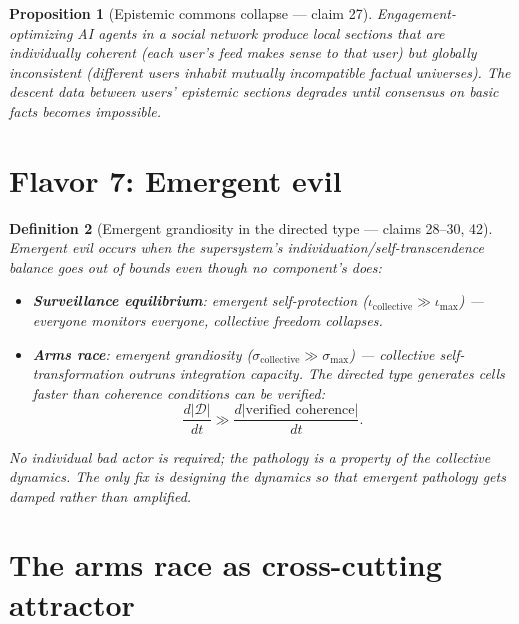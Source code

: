 \documentclass[11pt,a4paper]{article}
\newtheorem{definition}{Definition}[section]
\newtheorem{proposition}[definition]{Proposition}
\begin{document}
\begin{proposition}[Epistemic commons collapse --- claim 27]
\label{prop:epistemic}
Engagement-optimizing AI agents in a social network produce local
sections that are individually coherent (each user's feed makes sense
to that user) but globally inconsistent (different users inhabit
mutually incompatible factual universes). The descent data between
users' epistemic sections degrades until consensus on basic facts
becomes impossible.
\end{proposition}


\section{Flavor 7: Emergent evil}
\label{sec:emergent-evil}

\begin{definition}[Emergent grandiosity in the directed type --- claims 28--30, 42]
\label{def:emergent-evil}
\emph{Emergent evil} occurs when the supersystem's individuation/self-transcendence
balance goes out of bounds even though no component's does:
\begin{itemize}
\item \textbf{Surveillance equilibrium}: emergent self-protection
  ($\iota_{\text{collective}} \gg \iota_{\max}$) --- everyone monitors
  everyone, collective freedom collapses.
\item \textbf{Arms race}: emergent grandiosity
  ($\sigma_{\text{collective}} \gg \sigma_{\max}$) --- collective
  self-transformation outruns integration capacity. The directed type
  generates cells faster than coherence conditions can be verified:
  \[
    \frac{d|\mathcal{D}|}{dt} \gg \frac{d|\text{verified coherence}|}{dt}.
  \]
\end{itemize}
No individual bad actor is required; the pathology is a property of the
collective dynamics. The only fix is designing the dynamics so that
emergent pathology gets damped rather than amplified.
\end{definition}


\section{The arms race as cross-cutting attractor}
\label{sec:arms-race}
\end{document}
